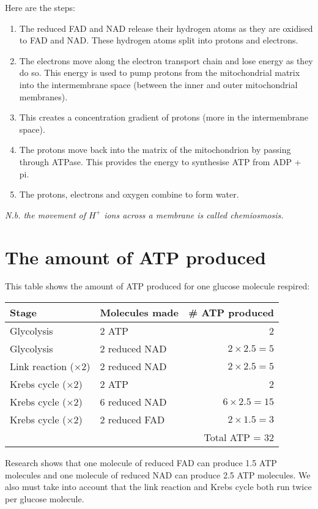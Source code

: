 \documentclass{article}
\begin{document}
Here are the steps:
\begin{enumerate}
	\item The reduced FAD and NAD release their hydrogen atoms as they are oxidised to FAD and NAD. These hydrogen atoms split into protons and electrons.
	\item The electrons move along the electron transport chain and lose energy as they do so. This energy is used to pump protons from the mitochondrial matrix into the intermembrane space (between the inner and outer mitochondrial membranes).
	\item This creates a concentration gradient of protons (more in the intermembrane space).
	\item The protons move back into the matrix of the mitochondrion by passing through ATPase. This provides the energy to synthesise ATP from ADP + pi.
	\item The protons, electrons and oxygen combine to form water.
\end{enumerate}

\textit{N.b. the movement of $H^+$ ions across a membrane is called chemiosmosis.}

\section*{The amount of ATP produced}
This table shows the amount of ATP produced for one glucose molecule respired:

\begin{center}
	\begin{tabular}{|l|l|r|}
		\hline
			Stage & Molecules made & \# ATP produced\\ \hline
			Glycolysis & 2 ATP & 2\\ \hline
			Glycolysis & 2 reduced NAD & $2 \times 2.5 = 5$\\ \hline
			Link reaction ($\times 2$) & 2 reduced NAD & $2 \times 2.5 = 5$\\ \hline
			Krebs cycle ($\times 2$) & 2 ATP & 2\\ \hline
			Krebs cycle ($\times 2$) & 6 reduced NAD & $6 \times 2.5 = 15$\\ \hline
			Krebs cycle ($\times 2$) & 2 reduced FAD & $2 \times 1.5 = 3$\\ \hline
			\multicolumn{3}{|r|}{Total ATP = 32}\\ \hline
	\end{tabular}
\end{center}

Research shows that one molecule of reduced FAD can produce 1.5 ATP molecules and one molecule of reduced NAD can produce 2.5 ATP molecules. We also must take into account that the link reaction and Krebs cycle both run twice per glucose molecule.
\end{document}
